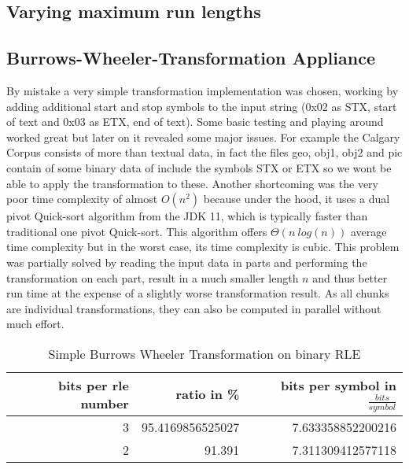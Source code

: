 \subsection{Varying maximum run lengths}
\par{

}

\subsection{Burrows-Wheeler-Transformation Appliance}
\par{
By mistake a very simple transformation implementation was chosen, working by adding additional start and stop symbols to the input string (0x02 as STX, start of text and 0x03 as ETX, end of text). Some basic testing and playing around worked great but later on it revealed some major issues. For example the Calgary Corpus consists of more than textual data, in fact the files geo, obj1, obj2 and pic contain of some binary data of include the symbols STX or ETX so we wont be able to apply the transformation to these. Another shortcoming was the very poor time complexity of almost $O (n^2)$ because under the hood, it uses a dual pivot Quick-sort algorithm from the JDK 11, which is typically faster than traditional one pivot Quick-sort. This algorithm offers $\Theta (n \: log(n))$ average time complexity but in the worst case, its time complexity is cubic. This problem was partially solved by reading the input data in parts and performing the transformation on each part, result in a much smaller length $n$ and thus better run time at the expense of a slightly worse transformation result. As all chunks are individual transformations, they can also be computed in parallel without much effort.

\begin{table}[h]
	\centering
	\begin{tabular}{r|r|r}	
		bits per rle number & ratio in \% & bits per symbol in $\frac{bits}{symbol}$\\
		\hline
		3 & 95.4169856525027 & 7.633358852200216\\
		2 & 91.391 & 7.311309412577118 \\
	\end{tabular}
	\caption{Simple Burrows Wheeler Transformation on binary RLE}
	\label{tab:t11 Simple Burrows Wheeler Transformation on binary RLE}
\end{table}
}
